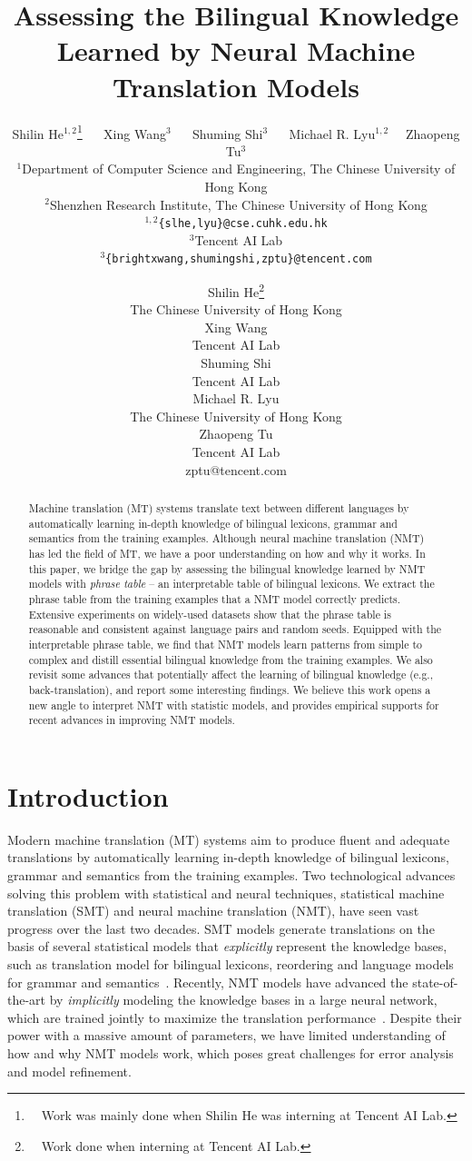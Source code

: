 \documentclass[11pt,a4paper]{article}
\title{Assessing the Bilingual Knowledge Learned by Neural Machine Translation Models}
\author{
Shilin He$^{1,2}$\thanks{~~Work was mainly done when Shilin He was interning at Tencent AI Lab.}  ~~  Xing Wang$^3$ ~~  Shuming Shi$^3$ ~~  Michael R. Lyu$^{1,2}$ ~~Zhaopeng Tu$^3$\\
{$^1$Department of Computer Science and Engineering, The Chinese University of Hong Kong} \\
{$^2$Shenzhen Research Institute, The Chinese University of Hong Kong} \\
$^{1,2}${\tt  \{slhe,lyu\}@cse.cuhk.edu.hk} \\
{$^3$Tencent AI Lab}    \\
$^3${\tt \{brightxwang,shumingshi,zptu\}@tencent.com}\\
}
\author{
Shilin He\thanks{~~Work done when interning at Tencent AI Lab.} \\ \normalsize The Chinese University of Hong Kong \\ \small \sf {slhe@cse.cuhk.edu.hk} \And
Xing Wang   \\ \normalsize Tencent AI Lab  \\ \small \sf {brightxwang@tencent.com} \AND
Shuming Shi \\  \normalsize Tencent AI Lab  \\ \small \sf {shumingshi@tencent.com} \And
Michael R. Lyu \\ \normalsize The Chinese University of Hong Kong   \\ \small \sf {lyu@cse.cuhk.edu.hk} \And
Zhaopeng Tu \\ \normalsize Tencent AI Lab  \\ \small \sf zptu@tencent.com
}
\begin{document}
\maketitle


\begin{abstract}
Machine translation (MT) systems translate text between different languages by automatically learning in-depth knowledge of bilingual lexicons, grammar and semantics from the training examples.
Although neural machine translation (NMT) has led the field of MT, we have a poor understanding on how and why it works. In this paper, we bridge the gap by assessing the bilingual knowledge learned by NMT models with {\em phrase table} -- an interpretable table of bilingual lexicons.
We extract the phrase table from the training examples that a NMT model correctly predicts.
Extensive experiments on widely-used datasets show that the phrase table is reasonable and consistent against language pairs and random seeds. Equipped with the interpretable phrase table, we find that NMT models learn patterns from simple to complex and distill essential bilingual knowledge from the training examples.
We also revisit some advances that potentially affect the learning of bilingual knowledge (e.g., back-translation), and report some interesting findings.
We believe this work opens a new angle to interpret NMT with statistic models, and provides empirical supports for recent advances in improving NMT models.


\end{abstract}

\section{Introduction}

Modern machine translation (MT) systems aim to produce fluent and adequate translations by automatically learning in-depth knowledge of bilingual lexicons, grammar and semantics from the training examples. 
Two technological advances solving this problem with statistical and neural techniques, statistical machine translation (SMT) and neural machine translation (NMT), have seen vast progress over the last two decades.
SMT models generate translations on the basis of several statistical models that {\em explicitly} represent the knowledge bases, such as translation model for bilingual lexicons, reordering and language models for grammar and semantics~\cite{koehn2009statistical}. Recently, NMT models have advanced the state-of-the-art by {\em implicitly} modeling the knowledge bases in a large neural network, which are trained jointly to maximize the translation performance~\cite{Bahdanau:2015:ICLR,gehring17:icml:2017,Vaswani:2017:NIPS}. 
Despite their power with a massive amount of parameters, we have limited understanding of how and why NMT models work, which poses great challenges for error analysis and model refinement.
\end{document}
